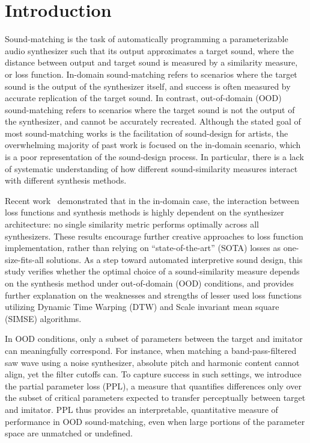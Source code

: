 \documentclass[runningheads]{llncs}
\begin{document}
\section{Introduction}
\label{sec:intro} 

Sound-matching is the task of automatically programming a parameterizable audio synthesizer such that its output approximates a target sound, where the distance between output and target sound is measured by a similarity measure, or loss function. In-domain sound-matching refers to scenarios where the target sound is the output of the synthesizer itself, and success is often measured by accurate replication of the target sound. In contrast, out-of-domain (OOD) sound-matching refers to scenarios where the target sound is not the output of the synthesizer, and cannot be accurately recreated. Although the stated goal of most sound-matching works is the facilitation of sound-design for artists, the overwhelming majority of past work is focused on the in-domain scenario, which is a poor representation of the sound-design process. In particular, there is a lack of systematic understanding of how different sound-similarity measures interact with different synthesis methods.

 Recent work~\cite{salimi2025evaluating} demonstrated that in the in-domain case, the interaction between loss functions and synthesis methods is highly dependent on the synthesizer architecture: no single similarity metric performs optimally across all synthesizers. These results encourage further creative approaches to loss function implementation, rather than relying on ``state-of-the-art'' (SOTA) losses as one-size-fits-all solutions. As a step toward automated interpretive sound design, this study verifies whether the optimal choice of a sound-similarity measure depends on the synthesis method under out-of-domain (OOD) conditions, and provides further explanation on the weaknesses and strengths of lesser used loss functions utilizing Dynamic Time Warping (DTW) and Scale invariant mean square (SIMSE) algorithms.

In OOD conditions, only a subset of parameters between the target and imitator can meaningfully correspond.
For instance, when matching a band-pass-filtered saw wave using a noise synthesizer, absolute pitch and harmonic content cannot align, yet the filter cutoffs can. To capture success in such settings, we introduce the partial parameter loss (PPL), a measure that quantifies differences only over the subset of critical parameters expected to transfer perceptually between target and imitator.
PPL thus provides an interpretable, quantitative measure of performance in OOD sound-matching, even when large portions of the parameter space are unmatched or undefined.
\end{document}
